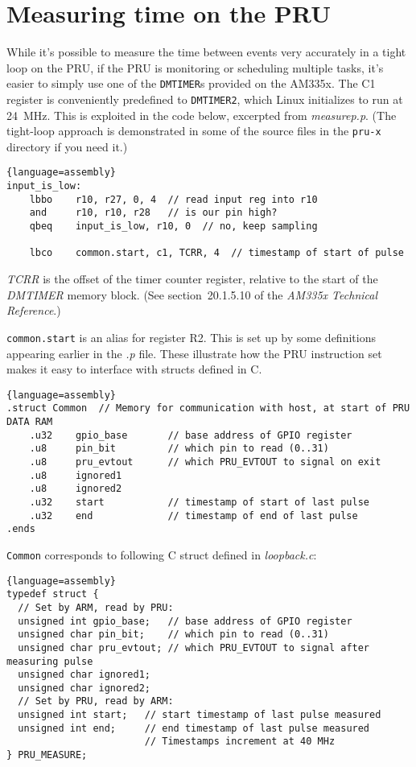\documentclass[letterpaper,11pt,fleqn]{article}
\newcommand{\techref}{\textit{AM335x Technical Reference}}
\begin{document}
\section{Measuring time on the PRU} \label{sec-measuring}

While it's possible to measure the time between events very accurately in a
tight loop on the PRU, if the PRU is monitoring or scheduling multiple tasks,
it's easier to simply use one of the \texttt{DMTIMER}s provided on the AM335x.
The C1 register is conveniently predefined to \texttt{DMTIMER2}, which Linux
initializes to run at \SI{24}{\mega\hertz}. This is exploited in the code
below, excerpted from \textit{measurep.p}. (The tight-loop approach is
demonstrated in some of the source files in the \texttt{pru-x} directory if
you need it.)

\begin{lstlisting}{language=assembly}
input_is_low:
    lbbo    r10, r27, 0, 4  // read input reg into r10
    and     r10, r10, r28   // is our pin high?
    qbeq    input_is_low, r10, 0  // no, keep sampling

    lbco    common.start, c1, TCRR, 4  // timestamp of start of pulse
\end{lstlisting}

\textit{TCRR} is the offset of the timer counter register, relative to
the start of the \textit{DMTIMER} memory block. (See section~20.1.5.10 of the
\techref.)

\texttt{common.start} is an alias for register R2. This is set up by some
definitions appearing earlier in the \textit{.p} file. These illustrate how
the PRU instruction set makes it easy to interface with structs defined in C.

\begin{lstlisting}{language=assembly}
.struct Common	// Memory for communication with host, at start of PRU DATA RAM
    .u32    gpio_base       // base address of GPIO register
    .u8     pin_bit         // which pin to read (0..31)
    .u8     pru_evtout      // which PRU_EVTOUT to signal on exit
    .u8     ignored1
    .u8     ignored2
    .u32    start           // timestamp of start of last pulse
    .u32    end             // timestamp of end of last pulse
.ends
\end{lstlisting}

\texttt{Common} corresponds to following C struct defined in
\textit{loopback.c}:

\begin{lstlisting}{language=assembly}
typedef struct {
  // Set by ARM, read by PRU:
  unsigned int gpio_base;   // base address of GPIO register
  unsigned char pin_bit;    // which pin to read (0..31)
  unsigned char pru_evtout; // which PRU_EVTOUT to signal after measuring pulse
  unsigned char ignored1;
  unsigned char ignored2;
  // Set by PRU, read by ARM:
  unsigned int start;   // start timestamp of last pulse measured
  unsigned int end;     // end timestamp of last pulse measured
                        // Timestamps increment at 40 MHz
} PRU_MEASURE;
\end{lstlisting}
\end{document}
